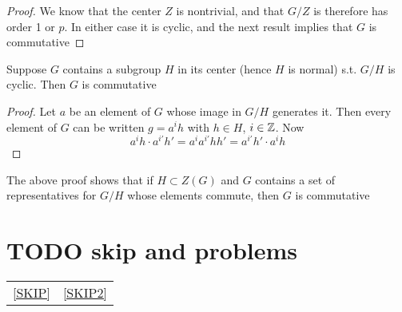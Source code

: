 \documentclass[11pt]{article}
\begin{document}
\begin{proof}
We know that the center \(Z\) is nontrivial, and that \(G/Z\) is therefore has order 1 or \(p\).
In either case it is cyclic, and the next result implies that \(G\) is commutative
\end{proof}

\begin{lemma}[]
Suppose \(G\) contains a subgroup \(H\) in its center (hence \(H\) is normal) s.t. \(G/H\) is
cyclic. Then \(G\) is commutative
\end{lemma}

\begin{proof}
Let \(a\) be an element of \(G\) whose image in \(G/H\) generates it. Then every element
of \(G\) can be written \(g=a^ih\) with \(h\in H\), \(i\in\mathbb{Z}\). Now
\begin{equation*}
a^ih\cdot a^{i'}h'=a^ia^{i'}hh'=a^{i'}h'\cdot a^ih
\end{equation*}
\end{proof}

The above proof shows that if \(H\subset Z(G)\) and \(G\) contains a set of representatives
for \(G/H\) whose elements commute, then \(G\) is commutative



\section{{\bfseries\sffamily TODO} skip and problems}
\label{sec:org8545d51}
\begin{center}
\begin{tabular}{ll}
\ref{SKIP} & \ref{SKIP2}\\
\end{tabular}
\end{center}
\end{document}
